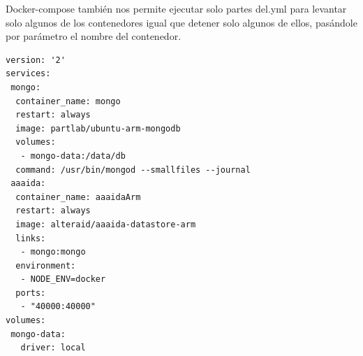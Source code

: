 Docker-compose también nos permite ejecutar solo partes del.yml para levantar solo algunos de los contenedores igual que detener solo algunos de ellos, pasándole por parámetro el nombre del contenedor. 
\begin{center}
\begin{verbatim}
version: '2'
services:
 mongo:
  container_name: mongo
  restart: always
  image: partlab/ubuntu-arm-mongodb
  volumes:
   - mongo-data:/data/db
  command: /usr/bin/mongod --smallfiles --journal
 aaaida:
  container_name: aaaidaArm
  restart: always
  image: alteraid/aaaida-datastore-arm
  links:
   - mongo:mongo 
  environment:
   - NODE_ENV=docker
  ports:
   - "40000:40000"
volumes:
 mongo-data:
   driver: local
\end{verbatim}
\end{center} 
